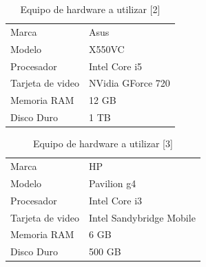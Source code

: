 \documentclass[12pt, a4paper, titlepage]{report}
\begin{document}
    				\begin{table}[H]
        				\begin{tabular}{ |p{3.5cm}||p{9.5cm}|}
        					\hline
        					\rowcolor{guindapoli}
        					\multicolumn{2}{|c|}{\textbf{\textcolor{white}{Equipo de hardware [2]}}}\\
        					\hline
        					\rowcolor{azulfuerte}Marca & Asus\\
        					\hline
        					\cellcolor{azulclaro}Modelo & X550VC\\ 
        					\hline
        					\cellcolor{azulclaro}Procesador &
        					Intel Core i5\\
        					\hline
        					\cellcolor{azulclaro}Tarjeta de video & 
        					NVidia GForce 720\\
        					\hline
        					\cellcolor{azulclaro}Memoria RAM &
        					12 GB\\
        					\hline
        					\cellcolor{azulclaro}Disco Duro &
        					1 TB\\
        					\hline
        				\end{tabular}
    				\caption[Equipo de Hardware 2]{Equipo de hardware a utilizar [2]}
    				\end{table}
    				\begin{table}[H]
        				\begin{tabular}{ |p{3.5cm}||p{9.5cm}|}
        					\hline
        					\rowcolor{guindapoli}
        					\multicolumn{2}{|c|}{\textbf{\textcolor{white}{Equipo de hardware [3]}}}\\
        					\hline
        					\rowcolor{azulfuerte}Marca & HP\\
        					\hline
        					\cellcolor{azulclaro}Modelo & Pavilion g4\\ 
        					\hline
        					\cellcolor{azulclaro}Procesador &
        					Intel Core i3\\
        					\hline
        					\cellcolor{azulclaro}Tarjeta de video & 
        					Intel Sandybridge Mobile\\
        					\hline
        					\cellcolor{azulclaro}Memoria RAM &
        					6 GB\\
        					\hline
        					\cellcolor{azulclaro}Disco Duro &
        					500 GB\\
        					\hline
        				\end{tabular}
    				\caption[Equipo de Hardware 3]{Equipo de hardware a utilizar [3]}
    				\end{table}
\end{document}
